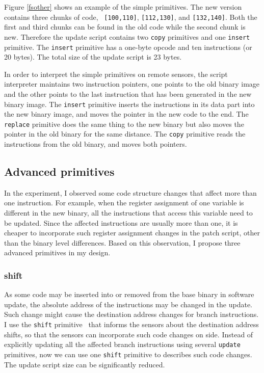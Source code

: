 Figure \ref{fsother} shows an example of the simple primitives. The new version contains three chunks of code, {\tt 
[100,110]}, {\tt [112,130]}, and {\tt [132,140]}. Both the first and third chunks can be found in the old code while 
the second chunk is new. Therefore the update script contains two {\tt copy} primitives and one {\tt insert} primitive. 
The {\tt insert} primitive has a one-byte opcode and ten instructions (or 20 bytes). The total size of the update 
script is 23 bytes.  

In order to interpret the simple primitives on remote sensors,
the script interpreter maintains two instruction pointers, one points to the old
binary image and the other points to the last instruction that has been generated
in the new binary image. 
The {\tt insert} primitive inserts the instructions
in its data part into the new binary image, and moves the pointer in the
new code to the end. The {\tt replace} primitive does the same thing to
the new binary but also moves the pointer in the old binary for the
same distance. The {\tt copy} primitive reads the instructions from the
old binary, and moves both pointers.
 
\subsection {Advanced primitives}
In the experiment, I observed some code structure changes that affect more than one instruction. For example, when the 
register assignment of one variable is different in the new binary, all the instructions that access this variable need 
to be updated. Since the affected instructions are usually more than one, it is cheaper to incorporate such register 
assignment changes in the patch script, other than the binary level differences. Based on this observation, I propose 
three advanced primitives in my design.

\subsubsection {shift}
As some code may be inserted into or removed from the base binary in software update, the absolute address of the 
instructions may be changed in the update. Such change might cause the destination address changes for branch 
instructions.  I use the {\tt shift} primitive~\cite{related:script} that informs the sensors about the destination 
address shifts, so that the sensors can incorporate such code changes on side. Instead of explicitly updating all the 
affected branch instructions using several {\tt update} primitives, now we can use one  {\tt shift} primitive to 
describes such code changes. The update script size can be significantly reduced. 

